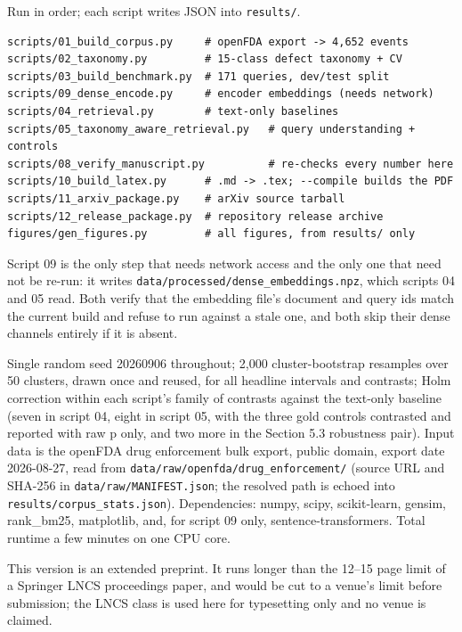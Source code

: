 \documentclass[runningheads]{llncs}
\begin{document}
Run in order; each script writes JSON into \texttt{results/}.

\par\noindent\begin{minipage}{\linewidth}
\begin{verbatim}
scripts/01_build_corpus.py     # openFDA export -> 4,652 events
scripts/02_taxonomy.py         # 15-class defect taxonomy + CV
scripts/03_build_benchmark.py  # 171 queries, dev/test split
scripts/09_dense_encode.py     # encoder embeddings (needs network)
scripts/04_retrieval.py        # text-only baselines
scripts/05_taxonomy_aware_retrieval.py   # query understanding + controls
scripts/08_verify_manuscript.py          # re-checks every number here
scripts/10_build_latex.py      # .md -> .tex; --compile builds the PDF
scripts/11_arxiv_package.py    # arXiv source tarball
scripts/12_release_package.py  # repository release archive
figures/gen_figures.py         # all figures, from results/ only
\end{verbatim}
\end{minipage}

Script 09 is the only step that needs network access and the only one that need not be re-run: it writes \texttt{data/processed/\allowbreak{}dense\_\allowbreak{}embeddings.npz}, which scripts 04 and 05 read. Both verify that the embedding file's document and query ids match the current build and refuse to run against a stale one, and both skip their dense channels entirely if it is absent.

Single random seed 20260906 throughout; 2,000 cluster-bootstrap resamples over 50 clusters, drawn once and reused, for all headline intervals and contrasts; Holm correction within each script's family of contrasts against the text-only baseline (seven in script 04, eight in script 05, with the three gold controls contrasted and reported with raw p only, and two more in the Section 5.3 robustness pair). Input data is the openFDA drug enforcement bulk export, public domain, export date 2026-08-27, read from \texttt{data/raw/\allowbreak{}openfda/\allowbreak{}drug\_\allowbreak{}enforcement/} (source URL and SHA-256 in \texttt{data/raw/\allowbreak{}MANIFEST.json}; the resolved path is echoed into \texttt{results/corpus\_\allowbreak{}stats.json}). Dependencies: numpy, scipy, scikit-learn, gensim, rank\_bm25, matplotlib, and, for script 09 only, sentence-transformers. Total runtime a few minutes on one CPU core.

This version is an extended preprint. It runs longer than the 12--15 page limit of a Springer LNCS proceedings paper, and would be cut to a venue's limit before submission; the LNCS class is used here for typesetting only and no venue is claimed.
\end{document}
